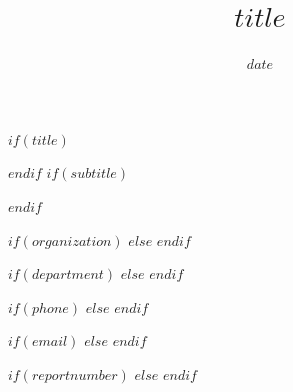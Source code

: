 
\setlength{\TPHorizModule}{1cm}
\setlength{\TPVertModule}{1cm}
\def\placefig#1#2#3#4{\begin{textblock}{.1}(#1,#2)\rlap{\texttt{[image: \#4]}}\end{textblock}}


$if(title)$
\title{$title$}
$endif$
$if(subtitle)$
\usepackage{etoolbox}
\makeatletter
\providecommand{\subtitle}[1]{%
  \apptocmd{\@title}{\par {\large #1 \par}}{}{}
}
\makeatother
\subtitle{$subtitle$}
$endif$
\date{$date$}

\def\Date{\number\day}
\def\Month{\ifcase\month\or
 January\or February\or March\or April\or May\or June\or
 July\or August\or September\or October\or November\or December\fi}
\def\Year{\number\year}


\makeatletter
\def\organization#1{\gdef\@organization{#1}}
\def\telephone#1{\gdef\@telephone{#1}}
\def\email#1{\gdef\@email{#1}}
\makeatother
$if(organization)$
  \organization{$organization$}
$else$
  \organization{}
$endif$

$if(department)$
  \def\name{$department$}
$else$
  \def\name{}
$endif$

$if(phone)$
  \telephone{$phone$}
$else$
  \telephone{}
$endif$

$if(email)$
  \email{$email$}
$else$
  \email{}
$endif$

$if(reportnumber)$
  \def\reportnumber{$reportnumber$}
$else$
  \def\reportnumber{Please provide a report number in the metadata}
$endif$

\def\webaddress{\url{https://www.etsmtl.ca}}
\def\extraspace{\vspace*{1.6cm}}
\makeatletter
\def\contactdetails{Service de la bibliothèque\\
École de technologie supérieure\\
1100, rue Notre-Dame Ouest\\
Montréal (Québec)\\
H3C 1K3\\
\\
Phone: +1 514 396-8946\\
Fax: +1 514 396-8633\\
Email: \href{mailto:biblio@etsmtl.ca}{biblio@etsmtl.ca}
}
\makeatother

